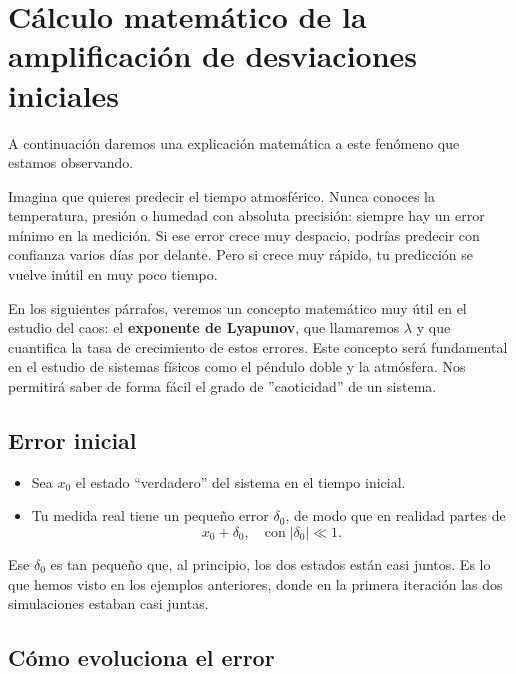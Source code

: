 \documentclass[
  10pt,
  a4paper,
  DIV=11,
  numbers=noendperiod,
  open=any]{scrreprt}
\providecommand{\tightlist}{%
  \setlength{\itemsep}{0pt}\setlength{\parskip}{0pt}}
\numberwithin{equation}{chapter}
\numberwithin{equation}{section}
\renewcommand{\[}{\begin{equation}}
\renewcommand{\]}{\end{equation}}
\begin{document}
\section{Cálculo matemático de la amplificación de desviaciones
iniciales}\label{cuxe1lculo-matemuxe1tico-de-la-amplificaciuxf3n-de-desviaciones-iniciales}

A continuación daremos una explicación matemática a este fenómeno que
estamos observando.

Imagina que quieres predecir el tiempo atmosférico. Nunca conoces la
temperatura, presión o humedad con absoluta precisión: siempre hay un
error mínimo en la medición. Si ese error crece muy despacio, podrías
predecir con confianza varios días por delante. Pero si crece muy
rápido, tu predicción se vuelve inútil en muy poco tiempo.

En los siguientes párrafos, veremos un concepto matemático muy útil en el
estudio del caos: el \textbf{exponente de Lyapunov}, que llamaremos
\(\lambda\) y que cuantifica la tasa de crecimiento de estos errores. Este concepto será fundamental en el estudio de sistemas físicos como el péndulo doble y la atmósfera. Nos permitirá saber de forma fácil el grado de ''caoticidad'' de un sistema. 

\subsection{Error inicial}\label{error-inicial}

\begin{itemize}
\tightlist
\item
  Sea \(x_0\) el estado ``verdadero'' del sistema en el tiempo
  inicial.\\
\item
  Tu medida real tiene un pequeño error \(\delta_0\), de modo que en
  realidad partes de\\
  \[
     x_0 + \delta_0,
     \quad\text{con}\;|\delta_0|\ll 1.
   \]
\end{itemize}

Ese \(\delta_0\) es tan pequeño que, al principio, los dos estados están
casi juntos. Es lo que hemos visto en los ejemplos anteriores, donde en
la primera iteración las dos simulaciones estaban casi juntas.

\subsection{Cómo evoluciona el error}\label{cuxf3mo-evoluciona-el-error}
\end{document}
